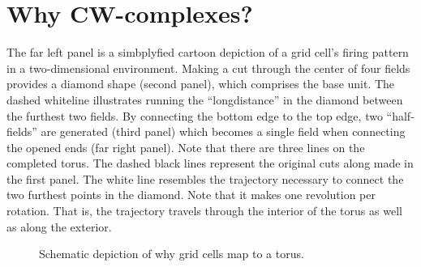 \documentclass{article}
\begin{document}
\section{Why CW-complexes?}

The far left panel is a simbplyfied cartoon depiction of a grid cell’s firing pattern in a two-dimensional environment. Making a cut through the center of four fields provides a diamond shape (second panel), which comprises the base unit. The dashed whiteline illustrates running the “longdistance” in the diamond between the furthest two fields. By connecting the bottom edge to the top edge, two “half-fields” are generated (third panel) which becomes a single field when connecting the opened ends (far right panel). Note that there are three lines on the completed torus. The dashed black lines represent the original cuts along made in the first panel. The white line resembles the trajectory necessary to connect the two furthest points in the diamond. Note that it makes one revolution per rotation. That is, the trajectory travels through the interior of the torus as well as along the exterior.

\begin{figure}[H]
    \caption{Schematic depiction of why grid cells map to a torus.}
    \label{image1}
\end{figure}


\end{document}
